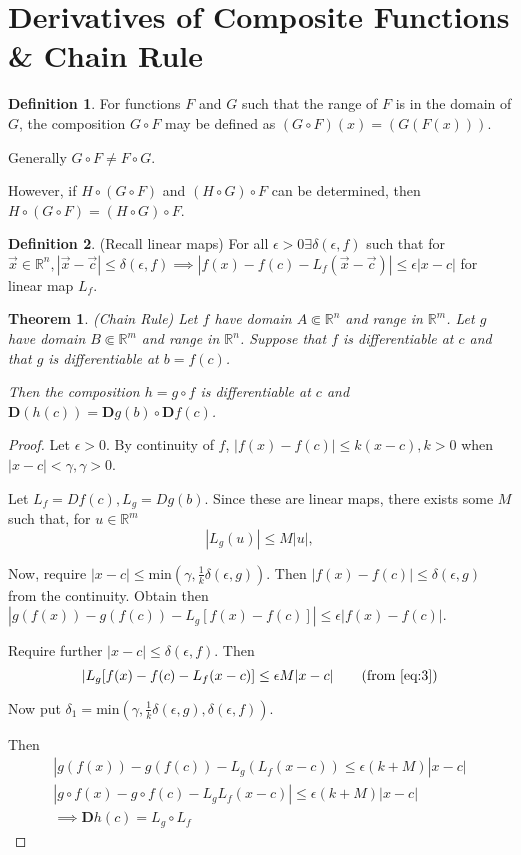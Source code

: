 \documentclass[12pt]{article}
\newcommand{\R}{\mathbb{R}}
\newtheorem{theorem}{Theorem}[section]
\theoremstyle{definition}
\newtheorem{definition}{Definition}[section]
\theoremstyle{remark}
\begin{document}
\section{Derivatives of Composite Functions \& Chain Rule}
\begin{definition}
    For functions $F$ and $G$ such that the range of $F$ is in the domain of $G$, the composition $G\circ F$ may be defined as $(G\circ F)(x)=(G(F(x)))$.

    Generally $G \circ F \not = F \circ G$.

    However, if $H\circ (G \circ F)$ and $(H\circ G)\circ F$ can be determined, then $H\circ (G\circ F) = (H\circ G) \circ F$.
\end{definition}
\begin{definition}
    (Recall linear maps) For all $\epsilon > 0 \exists \delta(\epsilon, f)$ such that for $\vec{x}\in\R^n, |\vec{x}-\vec{c}|\leq\delta(\epsilon,f)\implies|f(x)-f(c)-L_f(\vec{x}-\vec{c})|\leq\epsilon|x-c|$ for linear map $L_f$.
\end{definition}
\begin{theorem}\label{thm:8.1}
   (Chain Rule) Let $f$ have domain $A\Subset\R^n$ and range in $\R^m$. Let $g$ have domain $B\Subset\R^m$ and range in $\R^n$. Suppose that $f$ is differentiable at $c$ and that $g$ is differentiable at $b=f(c)$.

   Then the composition $h=g\circ f$ is differentiable at $c$ and $\textbf{D}(h(c))=\textbf{D}g(b)\circ \textbf{D}f(c)$.
\end{theorem}
\begin{proof}
    Let $\epsilon>0$. By continuity of $f$, $|f(x)-f(c)|\leq k(x-c), k>0$ when $|x-c|<\gamma, \gamma> 0$.

    Let $L_f=Df(c), L_g=Dg(b)$. Since these are linear maps, there exists some $M$ such that, for $u\in\R^m$ 
    \begin{equation}\label{eq:3}
        |L_g(u)|\leq M|u|, \tag{*}
    \end{equation}
    
    Now, require $|x-c|\leq\text{min}(\gamma, \frac{1}{k}\delta(\epsilon,g))$. Then $|f(x)-f(c)|\leq\delta(\epsilon,g)$ from the continuity. Obtain then $|g(f(x))-g(f(c))-L_g[f(x)-f(c)]|\leq\epsilon|f(x)-f(c)|$.

    Require further $|x-c|\leq\delta(\epsilon, f)$. Then
    \begin{equation*}
         |L_g[f(x)-f(c)-L_f(x-c)]\leq\epsilon M|x-c|\tag{from \ref{eq:3}}
    \end{equation*}

    Now put $\delta_1=\text{min}(\gamma, \frac{1}{k}\delta(\epsilon,g), \delta(\epsilon,f))$.

    Then
    \begin{align*}
        |g(f(x))-g(f(c))-L_g(L_f(x-c))\leq\epsilon(k+M)|x-c|\\
        |g\circ f(x)-g\circ f(c)-L_gL_f(x-c)|\leq\epsilon(k+M)|x-c|\\
        \implies \textbf{D}h(c)=L_g\circ L_f
    \end{align*}
\end{proof}
\end{document}
